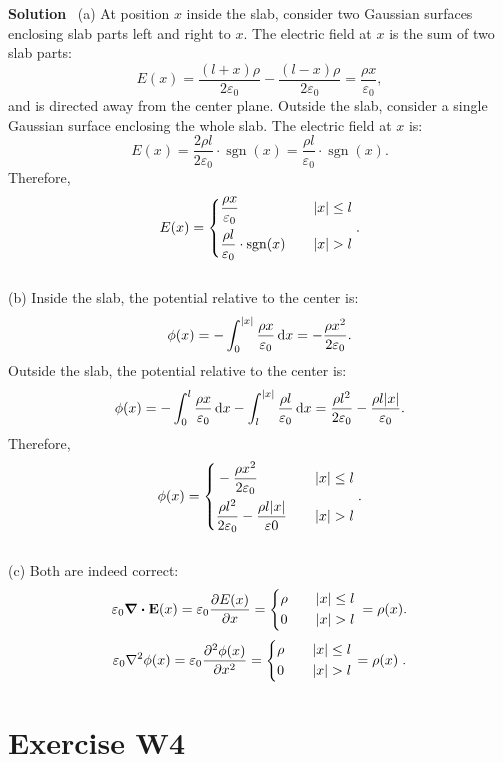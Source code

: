 \documentclass[hidelinks]{article}
\DeclareMathOperator{\sgn}{sgn}
\begin{document}
\vspace{0.5cm}
\noindent
\textbf{Solution} \, (a) At position $x$ inside the slab, consider two Gaussian surfaces enclosing slab parts left and right to $x$. The electric field at $x$ is the sum of two slab parts:
$$E(x) = \frac{(l+x)\rho}{2\varepsilon_0} - \frac{(l-x)\rho}{2\varepsilon_0} = \frac{\rho x}{\varepsilon_0},$$
and is directed away from the center plane. Outside the slab, consider a single Gaussian surface enclosing the whole slab. The electric field at $x$ is:
$$E(x) = \frac{2\rho l}{2\varepsilon_0} \cdot \sgn(x) = \frac{\rho l  }{\varepsilon_0} \cdot \sgn (x).$$
Therefore,
$$E(x) =  \left\{
\begin{aligned}
& \frac{\rho x}{\varepsilon_0} & \quad \abs{x}\leq l \\ 
& \frac{\rho l}{\varepsilon_0}\cdot\sgn (x) & \quad \abs{x}>l
\end{aligned}
\right. .
$$\\
(b) Inside the slab, the potential relative to the center is:
$$\phi(x) = -\int_0^{\abs{x}} \frac{\rho x}{\varepsilon_0} \, \mathrm{d}x = -\frac{\rho x^2}{2\varepsilon_0}. $$
Outside the slab, the potential relative to the center is:
$$\phi(x) = -\int_0^{l} \frac{\rho x}{\varepsilon_0} \, \mathrm{d}x - \int _l ^ {\abs{x}} \frac{\rho l}{\varepsilon_0} \, \mathrm{d}x = \frac{\rho l^2}{2\varepsilon_0} - \frac{\rho l \abs{x}}{\varepsilon_0}.$$
Therefore,
$$\phi(x) =  \left\{
\begin{aligned}
& -\frac{\rho x^2}{2\varepsilon_0} & \quad \abs{x}\leq l \\ 
& \frac{\rho l^2}{2\varepsilon_0}-\frac{\rho l \abs{x}}{\varepsilon0} & \quad \abs{x}>l
\end{aligned}
\right. .
$$\\
(c) Both are indeed correct:
$$\varepsilon_0 \div{\vb{E}(x)} = \varepsilon_0 \frac{\partial E(x)}{\partial x} = \left\{
\begin{aligned}
    &\rho &\quad \abs{x}\leq l \\
    & 0 & \quad \abs{x} >l
\end{aligned}
\right. \, = \rho(x).
$$
$$\varepsilon_0 \laplacian{\phi(x)} = \varepsilon_0 \frac{\partial^2 \phi(x)}{\partial x^2} = \left\{
\begin{aligned}
    &\rho &\quad \abs{x}\leq l \\
    & 0 & \quad \abs{x} >l
\end{aligned}
\, = \rho(x)
\right..
$$

\pagebreak

\section{Exercise W4}
\end{document}
